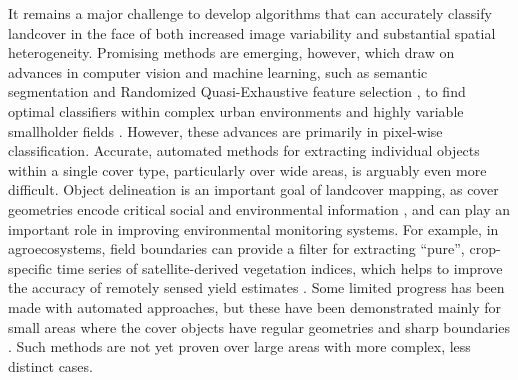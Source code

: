 \documentclass[preprint,12pt,authoryear]{elsarticle}
\begin{document}
It remains a major challenge to develop algorithms that can accurately classify landcover in the face of both increased image variability and substantial spatial heterogeneity. Promising methods are emerging, however, which draw on advances in computer vision and machine learning, such as semantic segmentation \citep[e.g.][]{schroff_object_2008} and Randomized Quasi-Exhaustive feature selection \citep{tokarczyk_features_2015}, to find optimal classifiers within complex urban environments \cite{frohlich_land_2013} and highly variable smallholder fields \citep[e.g.][]{debats_generalized_2015}. However, these advances are primarily in pixel-wise classification. Accurate, automated methods for extracting individual objects within a single cover type, particularly over wide areas, is arguably even more difficult. Object delineation is an important goal of landcover mapping, as cover geometries encode critical social and environmental information \citep{fritz_mapping_2015}, and can play an important role in improving environmental monitoring systems. For example, in agroecosystems, field boundaries can provide a filter for extracting ``pure'', crop-specific time series of satellite-derived vegetation indices, which helps to improve the accuracy of remotely sensed yield estimates \citep{estes_projected_2013, estes_comparing_2013}.  Some limited progress has been made with automated approaches, but these have been demonstrated mainly for small areas where the cover objects have regular geometries and sharp boundaries \citep[e.g. commercial agricultural fields][]{yan_automated_2014,ozdarici-ok_object-based_2014,ozdarici-ok_mapping_2015}. Such methods are not yet proven over large areas with more complex, less distinct cases. 
\end{document}
